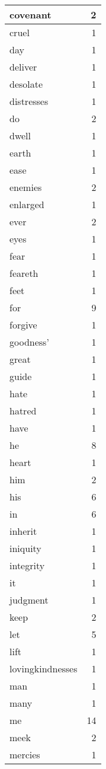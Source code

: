 \begin{center}
\begin{longtable}{l|r}
covenant & 2 \\ \hline
cruel & 1 \\ \hline
day & 1 \\ \hline
deliver & 1 \\ \hline
desolate & 1 \\ \hline
distresses & 1 \\ \hline
do & 2 \\ \hline
dwell & 1 \\ \hline
earth & 1 \\ \hline
ease & 1 \\ \hline
enemies & 2 \\ \hline
enlarged & 1 \\ \hline
ever & 2 \\ \hline
eyes & 1 \\ \hline
fear & 1 \\ \hline
feareth & 1 \\ \hline
feet & 1 \\ \hline
for & 9 \\ \hline
forgive & 1 \\ \hline
goodness' & 1 \\ \hline
great & 1 \\ \hline
guide & 1 \\ \hline
hate & 1 \\ \hline
hatred & 1 \\ \hline
have & 1 \\ \hline
he & 8 \\ \hline
heart & 1 \\ \hline
him & 2 \\ \hline
his & 6 \\ \hline
in & 6 \\ \hline
inherit & 1 \\ \hline
iniquity & 1 \\ \hline
integrity & 1 \\ \hline
it & 1 \\ \hline
judgment & 1 \\ \hline
keep & 2 \\ \hline
let & 5 \\ \hline
lift & 1 \\ \hline
lovingkindnesses & 1 \\ \hline
man & 1 \\ \hline
many & 1 \\ \hline
me & 14 \\ \hline
meek & 2 \\ \hline
mercies & 1 \\ \hline

\end{longtable}
\end{center}
